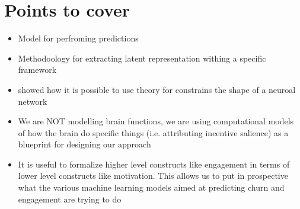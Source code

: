 \section{Points to cover}
\begin{itemize}
    \item Model for perfroming predictions
    \item Methodoology for extracting latent representation withing a specific framework
    \item showed how it is possible to use theory for constrains the shape of a neuroal network
    \item We are NOT modelling brain functions, we are using computational models of how the brain do specific things (i.e. attributing incentive salience) as a blueprint for designing our approach
    \item It is useful to formalize higher level constructs like engagement in terms of lower level constructs like motivation. This allows us to put in prospective what the various machine learning models aimed at predicting churn and engagement are trying to do
\end{itemize}


